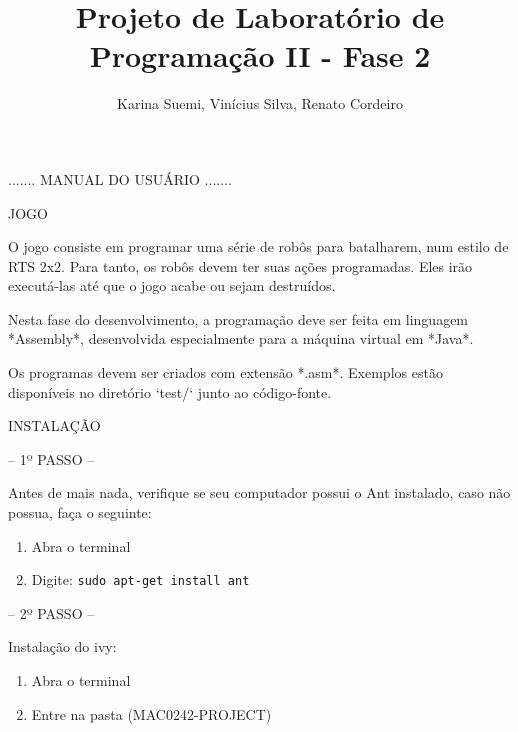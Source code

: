 \documentclass[a4paper]{article}
\title  {Projeto de Laboratório de Programação II - Fase 2}
\author {Karina Suemi, Vinícius Silva, Renato Cordeiro}
\date   {}
\begin{document}
\maketitle

\bigskip
\bigskip
\bigskip
\bigskip

{\textcolor{NavyBlue}{\Huge{....... MANUAL DO USUÁRIO .......}}


\newpage

     
{\textcolor{NavyBlue}{\LARGE JOGO }

\bigskip

O  jogo consiste  em programar uma  série de 
robôs para batalharem, num estilo de RTS 2x2.
Para  tanto,  os robôs devem  ter suas ações 
programadas. Eles irão executá-las até que o 
jogo acabe ou sejam destruídos.

Nesta fase do desenvolvimento, a programação 
deve  ser  feita   em  linguagem  *Assembly*,
desenvolvida  especialmente  para  a máquina 
virtual  em *Java*. 

Os programas devem  ser criados com extensão 
*.asm*.   Exemplos   estão   disponíveis  no 
diretório `test/` junto ao código-fonte. 



\bigskip
\bigskip
\bigskip
\bigskip


{\textcolor{NavyBlue}{\LARGE INSTALAÇÃO }
                
\bigskip
                                            
\textcolor{NavyBlue}{-- 1º PASSO --}

Antes de mais nada, verifique se seu computador possui
o Ant instalado, caso não possua, faça o seguinte:

\begin{enumerate}
    \item Abra o terminal

    \item Digite: \texttt{sudo apt-get install ant}
\end{enumerate}

\bigskip



\textcolor{NavyBlue}{-- 2º PASSO --}

Instalação do ivy:

\begin{enumerate}
    \item Abra o terminal

    \item Entre na pasta (MAC0242-PROJECT)


\end{enumerate}}}}
\end{document}

